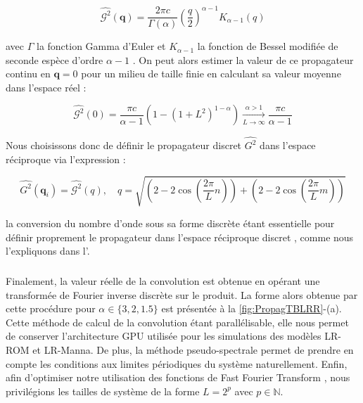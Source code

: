 \begin{equation}
	\hat{\mathcal{G}^2}(\mathbf{q})=\frac{2\pi c}{\Gamma\left(\alpha\right)} \left( \frac{q}{2} \right)^{\alpha-1}K_{\alpha-1}(q)
	\label{eq:propcontinu2D}
\end{equation}

\noindent avec $\Gamma$ la fonction Gamma d'Euler et $K_{\alpha -1}$ la fonction de Bessel modifiée de seconde espèce d'ordre $\alpha - 1$ \cite{abramowitz_handbook_1965}. On peut alors estimer la valeur de ce propagateur continu en $\mathbf{q}=0$ pour un milieu de taille finie en calculant sa valeur moyenne dans l'espace réel :

\begin{equation}
	\hat{\mathcal{G}^2}(0) = \frac{\pi c}{\alpha -1}\left( 1- \left( 1+L^2 \right)^{1-\alpha} \right) \xrightarrow[L\rightarrow\infty]{\alpha > 1} \frac{\pi c}{\alpha - 1}
	\label{eq:zerovalue}
\end{equation}

\noindent Nous choisissons donc de définir le propagateur discret $\hat{G^2}$ dans l'espace réciproque via l'expression :

\begin{equation}
	\hat{G^2}(\mathbf{q}_i) = \hat{\mathcal{G}^2}(q), \quad q = \sqrt{\left( 2-2\cos \left( \frac{2\pi}{L}n \right) \right) + \left( 2-2\cos \left( \frac{2\pi}{L}m \right) \right)}
\end{equation}

\noindent la conversion du nombre d'onde sous sa forme discrète étant essentielle pour définir proprement le propagateur dans l'espace réciproque discret \cite{ferrero_criticality_2019, rossi_finite-disorder_2022}, comme nous l'expliquons dans l'.

\subparagraph{}Finalement, la valeur réelle de la convolution est obtenue en opérant une transformée de Fourier inverse discrète sur le produit. La forme alors obtenue par cette procédure pour $\alpha \in \{ 3, 2, 1.5 \}$ est présentée à la \autoref{fig:PropagTBLRR}-(a). Cette méthode de calcul de la convolution étant parallélisable, elle nous permet de conserver l'architecture GPU utilisée pour les simulations des modèles LR-ROM et LR-Manna. De plus, la méthode pseudo-spectrale permet de prendre en compte les conditions aux limites périodiques du système naturellement. Enfin, afin d'optimiser notre utilisation des fonctions de Fast Fourier Transform \cite{cooley_algorithm_1965}, nous privilégions les tailles de système de la forme $L = 2^p$ avec $p \in \mathbb{N}$.

